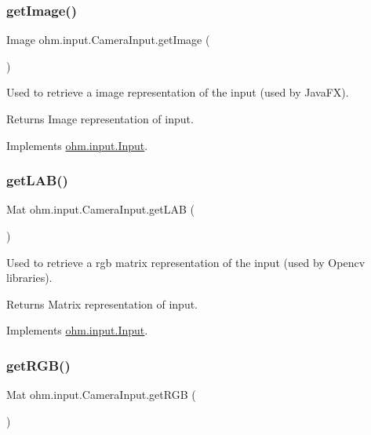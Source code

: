 \subsubsection{\texorpdfstring{get\+Image()}{getImage()}}
{\footnotesize\ttfamily Image ohm.\+input.\+Camera\+Input.\+get\+Image (\begin{DoxyParamCaption}{ }\end{DoxyParamCaption})}

Used to retrieve a image representation of the input (used by Java\+FX). \begin{DoxyReturn}{Returns}
Image representation of input. 
\end{DoxyReturn}


Implements \hyperlink{interfaceohm_1_1input_1_1_input_aecea73d845b9c88e69294dadcd15e4fe}{ohm.\+input.\+Input}.

\hypertarget{classohm_1_1input_1_1_camera_input_a1cee784ad09131e95ded21d07a42c8d4}{}\label{classohm_1_1input_1_1_camera_input_a1cee784ad09131e95ded21d07a42c8d4} 
\subsubsection{\texorpdfstring{get\+L\+A\+B()}{getLAB()}}
{\footnotesize\ttfamily Mat ohm.\+input.\+Camera\+Input.\+get\+L\+AB (\begin{DoxyParamCaption}{ }\end{DoxyParamCaption})}

Used to retrieve a rgb matrix representation of the input (used by Opencv libraries). \begin{DoxyReturn}{Returns}
Matrix representation of input. 
\end{DoxyReturn}


Implements \hyperlink{interfaceohm_1_1input_1_1_input_a3264bf8e72c6442076453b5d356b6534}{ohm.\+input.\+Input}.

\hypertarget{classohm_1_1input_1_1_camera_input_ad237c282f6c3367ef857d12ebb079b38}{}\label{classohm_1_1input_1_1_camera_input_ad237c282f6c3367ef857d12ebb079b38} 
\subsubsection{\texorpdfstring{get\+R\+G\+B()}{getRGB()}}
{\footnotesize\ttfamily Mat ohm.\+input.\+Camera\+Input.\+get\+R\+GB (\begin{DoxyParamCaption}{ }\end{DoxyParamCaption})}

